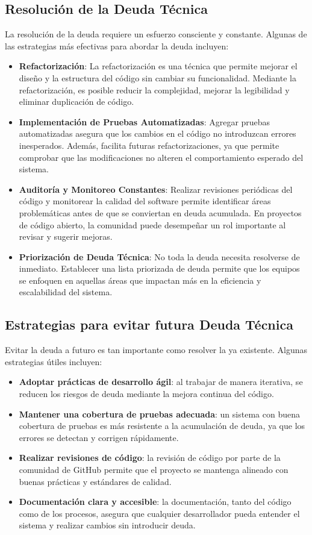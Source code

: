 \subsection{Resolución de la Deuda Técnica}
La resolución de la \gls{deuda} requiere un esfuerzo consciente y constante. Algunas de las estrategias más efectivas para abordar la \gls{deuda} incluyen:

\begin{itemize}
    \item \textbf{Refactorización}: La refactorización es una técnica que permite mejorar el diseño y la estructura del código sin cambiar su funcionalidad. Mediante la refactorización, es posible reducir la complejidad, mejorar la legibilidad y eliminar duplicación de código.
    \item \textbf{Implementación de Pruebas Automatizadas}: Agregar pruebas automatizadas asegura que los cambios en el código no introduzcan errores inesperados. Además, facilita futuras refactorizaciones, ya que permite comprobar que las modificaciones no alteren el comportamiento esperado del sistema.
    \item \textbf{Auditoría y Monitoreo Constantes}: Realizar revisiones periódicas del código y monitorear la calidad del software permite identificar áreas problemáticas antes de que se conviertan en \gls{deuda} acumulada. En proyectos de código abierto, la comunidad puede desempeñar un rol importante al revisar y sugerir mejoras.
    \item \textbf{Priorización de Deuda Técnica}: No toda la \gls{deuda} necesita resolverse de inmediato. Establecer una lista priorizada de \gls{deuda} permite que los equipos se enfoquen en aquellas áreas que impactan más en la eficiencia y escalabilidad del sistema.
\end{itemize}

\subsection{Estrategias para evitar futura Deuda Técnica}
Evitar la \gls{deuda} a futuro es tan importante como resolver la ya existente. Algunas estrategias útiles incluyen:

\begin{itemize}
    \item \textbf{Adoptar prácticas de desarrollo ágil}: al trabajar de manera iterativa, se reducen los riesgos de \gls{deuda} mediante la mejora continua del código. 
    \item \textbf{Mantener una cobertura de pruebas adecuada}: un sistema con buena cobertura de pruebas es más resistente a la acumulación de \gls{deuda}, ya que los errores se detectan y corrigen rápidamente.
    \item \textbf{Realizar revisiones de código}: la revisión de código por parte de la comunidad de GitHub permite que el proyecto se mantenga alineado con buenas prácticas y estándares de calidad.
    \item \textbf{Documentación clara y accesible}: la documentación, tanto del código como de los procesos, asegura que cualquier desarrollador pueda entender el sistema y realizar cambios sin introducir \gls{deuda}.
\end{itemize}


